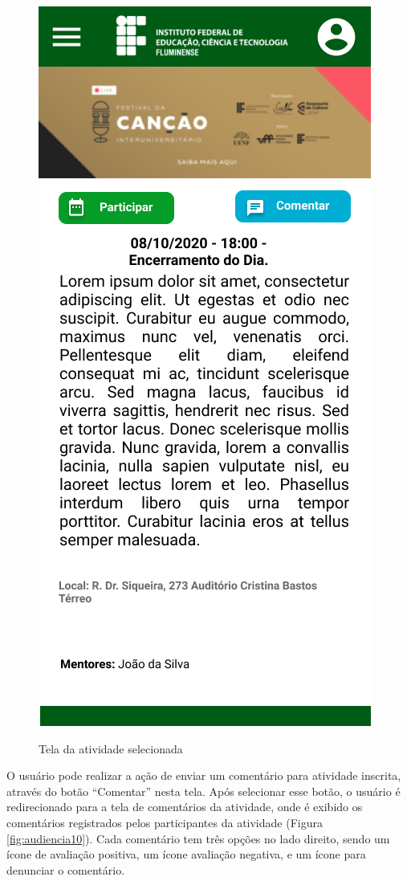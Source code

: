 \begin{figure}[H]
    \centering
    \caption{Tela da atividade selecionada}
    \includegraphics[scale=0.44]{figuras/Audiencia/9-Ativade.jpg}
    \label{fig:audiencia9}
\end{figure}

O usuário pode realizar a ação de enviar um comentário para atividade inscrita, através do botão “Comentar” nesta tela. Após selecionar esse botão, o usuário é redirecionado para a tela de comentários da atividade, onde é exibido os comentários registrados pelos participantes da atividade (Figura \ref{fig:audiencia10}). Cada comentário tem três opções no lado direito, sendo um ícone de avaliação positiva, um ícone avaliação negativa, e um ícone para denunciar o comentário.

